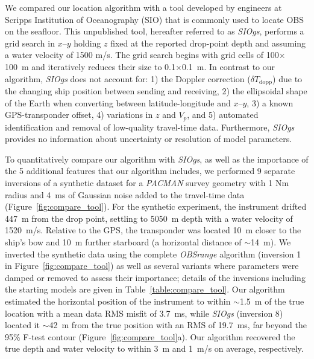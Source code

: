 We compared our location algorithm with a tool developed by engineers at Scripps Institution of Oceanography (SIO) that is commonly used to locate OBS on the seafloor. This unpublished tool, hereafter referred to as \textit{SIOgs}, performs a grid search in $x$--$y$ holding $z$ fixed at the reported drop-point depth and assuming a water velocity of 1500 m/s. The grid search begins with grid cells of 100$\times$100~m and iteratively reduces their size to 0.1$\times$0.1~m. In contrast to our algorithm, \textit{SIOgs} does not account for: 1) the Doppler correction ($\delta T_{\text{dopp}}$) due to the changing ship position between sending and receiving, 2) the ellipsoidal shape of the Earth when converting between latitude-longitude and $x$--$y$, 3) a known GPS-transponder offset, 4) variations in $z$ and $V_p$, and 5) automated identification and removal of low-quality travel-time data. Furthermore, \textit{SIOgs} provides no information about uncertainty or resolution of model parameters.  

To quantitatively compare our algorithm with \textit{SIOgs}, as well as the importance of the 5 additional features that our algorithm includes, we performed 9 separate inversions of a synthetic dataset for a \textit{PACMAN} survey geometry with 1 Nm radius and 4~ms of Gaussian noise added to the travel-time data (Figure~\ref{fig:compare_tool}). For the synthetic experiment, the instrument drifted 447~m from the drop point, settling to 5050~m depth with a water velocity of 1520~m/s. Relative to the GPS, the transponder was located 10~m closer to the ship's bow and 10~m further starboard (a horizontal distance of $\sim$14~m). We inverted the synthetic data using the complete \textit{OBSrange} algorithm (inversion 1 in Figure~\ref{fig:compare_tool}) as well as several variants where parameters were damped or removed to assess their importance; details of the inversions including the starting models are given in Table~\ref{table:compare_tool}. Our algorithm estimated the horizontal position of the instrument to within $\sim$1.5~m of the true location with a mean data RMS misfit of 3.7~ms, while \textit{SIOgs} (inversion 8) located it $\sim$42~m from the true position with an RMS of 19.7~ms, far beyond the 95\% F-test contour (Figure~\ref{fig:compare_tool}a). Our algorithm recovered the true depth and water velocity to within 3~m and 1~m/s on average, respectively.

